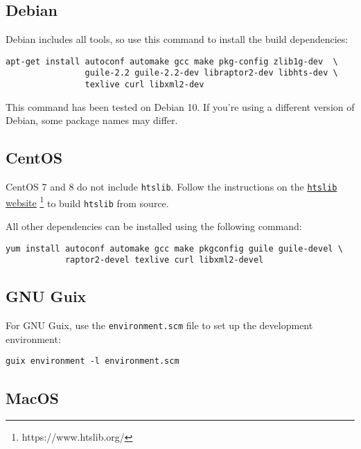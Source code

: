 \subsection{Debian}

  Debian includes all tools, so use this command to install the
  build dependencies:

\begin{siderules}
\begin{verbatim}
apt-get install autoconf automake gcc make pkg-config zlib1g-dev  \
                guile-2.2 guile-2.2-dev libraptor2-dev libhts-dev \
                texlive curl libxml2-dev
\end{verbatim}
\end{siderules}

  This command has been tested on Debian 10.  If you're using a different
  version of Debian, some package names may differ.

\subsection{CentOS}

  CentOS 7 and 8 do not include \texttt{htslib}.  Follow the instructions on
  the \href{https://www.htslib.org/}{\texttt{htslib} website}%
  \footnote{https://www.htslib.org/} to build \texttt{htslib} from source.

  All other dependencies can be installed using the following command:

\begin{siderules}
\begin{verbatim}
yum install autoconf automake gcc make pkgconfig guile guile-devel \
            raptor2-devel texlive curl libxml2-devel
\end{verbatim}
\end{siderules}

\subsection{GNU Guix}

  For GNU Guix, use the \texttt{environment.scm} file to set up the development
  environment:

\begin{siderules}
\begin{verbatim}
guix environment -l environment.scm
\end{verbatim}
\end{siderules}

\subsection{MacOS}

